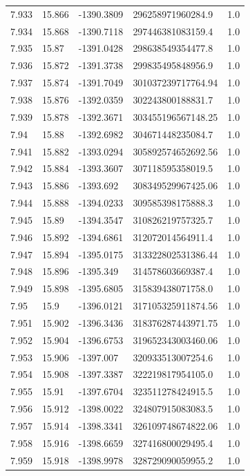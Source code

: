 \begin{tabular}{lllll}
7.933 & 15.866 & -1390.3809 & 296258971960284.9 & 1.0 \\
7.934 & 15.868 & -1390.7118 & 297446381083159.4 & 1.0 \\
7.935 & 15.87 & -1391.0428 & 298638549354477.8 & 1.0 \\
7.936 & 15.872 & -1391.3738 & 299835495848956.9 & 1.0 \\
7.937 & 15.874 & -1391.7049 & 301037239717764.94 & 1.0 \\
7.938 & 15.876 & -1392.0359 & 302243800188831.7 & 1.0 \\
7.939 & 15.878 & -1392.3671 & 303455196567148.25 & 1.0 \\
7.94 & 15.88 & -1392.6982 & 304671448235084.7 & 1.0 \\
7.941 & 15.882 & -1393.0294 & 305892574652692.56 & 1.0 \\
7.942 & 15.884 & -1393.3607 & 307118595358019.5 & 1.0 \\
7.943 & 15.886 & -1393.692 & 308349529967425.06 & 1.0 \\
7.944 & 15.888 & -1394.0233 & 309585398175888.3 & 1.0 \\
7.945 & 15.89 & -1394.3547 & 310826219757325.7 & 1.0 \\
7.946 & 15.892 & -1394.6861 & 312072014564911.4 & 1.0 \\
7.947 & 15.894 & -1395.0175 & 313322802531386.44 & 1.0 \\
7.948 & 15.896 & -1395.349 & 314578603669387.4 & 1.0 \\
7.949 & 15.898 & -1395.6805 & 315839438071758.0 & 1.0 \\
7.95 & 15.9 & -1396.0121 & 317105325911874.56 & 1.0 \\
7.951 & 15.902 & -1396.3436 & 318376287443971.75 & 1.0 \\
7.952 & 15.904 & -1396.6753 & 319652343003460.06 & 1.0 \\
7.953 & 15.906 & -1397.007 & 320933513007254.6 & 1.0 \\
7.954 & 15.908 & -1397.3387 & 322219817954105.0 & 1.0 \\
7.955 & 15.91 & -1397.6704 & 323511278424915.5 & 1.0 \\
7.956 & 15.912 & -1398.0022 & 324807915083083.5 & 1.0 \\
7.957 & 15.914 & -1398.3341 & 326109748674822.06 & 1.0 \\
7.958 & 15.916 & -1398.6659 & 327416800029495.4 & 1.0 \\
7.959 & 15.918 & -1398.9978 & 328729090059955.2 & 1.0 \\

\end{tabular}
